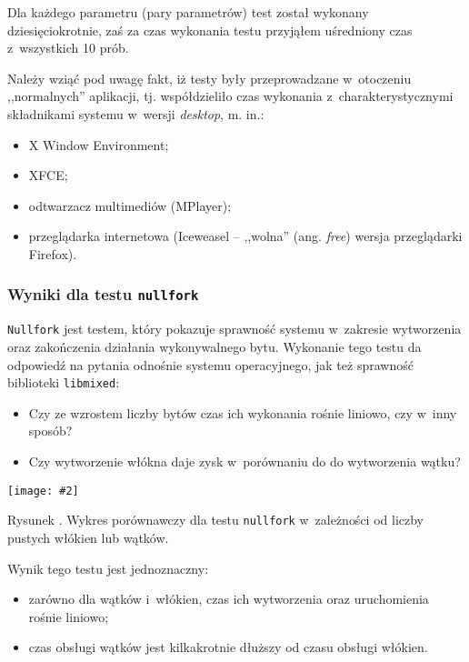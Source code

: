 \documentclass[12pt]{mwart}
\newcommand{\code}{\texttt}
\newcounter{figmain}
\newcommand{\myownfigure}[4]{ \newcounter{#1} \setcounter{#1}{\value{figmain}} \addtocounter{figmain}{1} \begin{center} \label{fig:#1} \centering \texttt{[image: \#2]}\\ \nopagebreak[5] \parbox[t]{11.5cm}{Rysunek \arabic{#1}. #3.} \end{center}}
\begin{document}
\par
\indent
  Dla każdego parametru (pary parametrów) test został wykonany dziesięciokrotnie, zaś za czas wykonania testu przyjąłem uśredniony 
  czas z~wszystkich 10 prób.
\par
\indent
  Należy wziąć pod uwagę fakt, iż testy były przeprowadzane w~otoczeniu ,,normalnych'' aplikacji, tj. współdzieliło czas wykonania z~charakterystycznymi składnikami
  systemu w~wersji \emph{desktop}, m. in.:
  \begin{itemize}
    \item X Window Environment;
    \item XFCE;
    \item odtwarzacz multimediów  (MPlayer);
    \item przeglądarka internetowa (Iceweasel -- ,,wolna'' (ang. \emph{free}) wersja przeglądarki Firefox).
  \end{itemize}
\par
\newpage
\subsubsection{Wyniki dla testu \code{nullfork}}
\indent
  \code{Nullfork} jest testem, który pokazuje sprawność systemu w~zakresie wytworzenia oraz zakończenia działania wykonywalnego bytu.
  Wykonanie tego testu da odpowiedź na pytania odnośnie systemu operacyjnego, jak też sprawność biblioteki \code{libmixed}:
  \begin{itemize}
    \item Czy ze wzrostem liczby bytów czas ich wykonania rośnie liniowo, czy w~inny sposób?
    \item Czy wytworzenie włókna daje zysk w~porównaniu do do wytworzenia wątku?
  \end{itemize}
\par
\indent
\myownfigure{nullfork}{nullfork.png}{Wykres porównawczy dla testu \code{nullfork} w~zależności od liczby pustych włókien lub wątków}{.65} 
\par
\begin{comment}
\indent
\myownfigure{nullforkLog}{nullforkLog.png}{Wykres porównawczy dla testu \code{nullfork} -- czas wykonania w~skali logarytmicznej}{.65} 
\par
\end{comment}
\indent
  Wynik tego testu jest jednoznaczny: 
  \begin{itemize}
    \item zarówno dla wątków i~włókien, czas ich wytworzenia oraz uruchomienia rośnie liniowo;
    \item czas obsługi wątków jest kilkakrotnie dłuższy od czasu obsługi włókien.
  \end{itemize}
\par
%
\newpage
\end{document}
